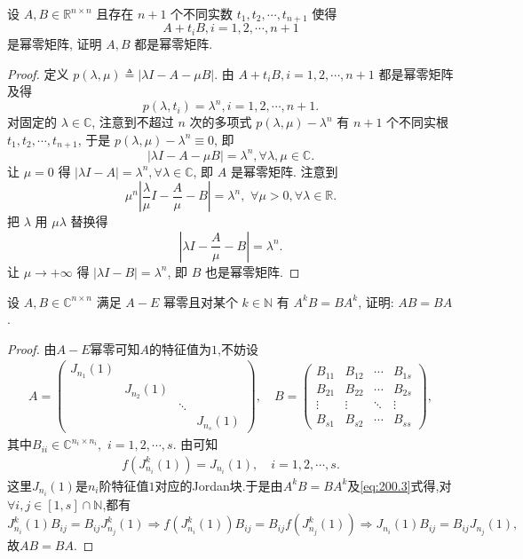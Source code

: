 \documentclass[../../main.tex]{subfiles}
\begin{document}
\begin{example}
设 \( A,B \in \mathbb{R}^{n \times n} \) 且存在 \( n+1 \) 个不同实数 \( t_1,t_2,\cdots,t_{n+1} \) 使得
\[
A + t_i B, i = 1,2,\cdots,n+1
\]
是幂零矩阵, 证明 \( A,B \) 都是幂零矩阵.
\end{example}
\begin{proof}
定义 \( p(\lambda,\mu) \triangleq |\lambda I - A - \mu B| \). 由 \( A + t_i B, i = 1,2,\cdots,n+1 \) 都是幂零矩阵及得
\[
p(\lambda,t_i) = \lambda^n, i = 1,2,\cdots,n+1.
\]
对固定的 \( \lambda \in \mathbb{C} \), 注意到不超过 \( n \) 次的多项式 \( p(\lambda,\mu)-\lambda^n \) 有 \( n+1 \) 个不同实根 \( t_1,t_2,\cdots,t_{n+1} \), 于是 \( p(\lambda,\mu)-\lambda^n \equiv 0 \), 即
\[
|\lambda I - A - \mu B| = \lambda^n, \forall \lambda, \mu \in \mathbb{C}.
\]
让 \( \mu = 0 \) 得 \( |\lambda I - A| = \lambda^n, \forall \lambda \in \mathbb{C} \), 即 \( A \) 是幂零矩阵. 注意到
\[
\mu^n \left| \frac{\lambda}{\mu} I - \frac{A}{\mu} - B \right| = \lambda^n,\,\, \forall \mu >0,\forall \lambda \in \mathbb{R}.
\]
把 \( \lambda \) 用 \( \mu\lambda \) 替换得
\[
\left| \lambda I - \frac{A}{\mu} - B \right| = \lambda^n.
\]
让 \( \mu \to +\infty \) 得 \( |\lambda I - B| = \lambda^n \), 即 \( B \) 也是幂零矩阵.

\end{proof}

\begin{example}
设 \( A,B \in \mathbb{C}^{n \times n} \) 满足 \( A - E \) 幂零且对某个 \( k \in \mathbb{N} \) 有 \( A^k B = BA^k \), 证明: \( AB = BA \).
\end{example}
\begin{proof}
由$A-E$幂零可知$A$的特征值为$1$,不妨设
\begin{align*}
A=\begin{pmatrix}
J_{n_1}(1)&&&\\
&J_{n_2}(1)&&\\
&&\ddots&\\
&&&J_{n_s}(1)
\end{pmatrix},\quad B=\begin{pmatrix}
B_{11}&B_{12}&\cdots&B_{1s}\\
B_{21}&B_{22}&\cdots&B_{2s}\\
\vdots&\vdots&\ddots&\vdots\\
B_{s1}&B_{s2}&\cdots&B_{ss}
\end{pmatrix},
\end{align*}
其中$B_{ii}\in \mathbb{C} ^{n_i\times n_i},\,\,i=1,2,\cdots ,s.$
由可知
\begin{align}
f\left( J_{n_i}^{k}(1) \right) =J_{n_i}(1),\quad i=1,2,\cdots ,s.
\label{eq:200.3}
\end{align}
这里$J_{n_i}(1)$是$n_i$阶特征值$1$对应的Jordan块.于是由$A^kB=BA^k$及\eqref{eq:200.3}式得,对$\forall i,j\in [1,s] \cap \mathbb{N}$,都有
\[
J_{n_i}^{k}(1) B_{ij}=B_{ij}J_{n_j}^{k}(1) \Longrightarrow f\left( J_{n_i}^{k}(1) \right) B_{ij}=B_{ij}f\left( J_{n_j}^{k}(1) \right) \Longrightarrow J_{n_i}(1) B_{ij}=B_{ij}J_{n_j}(1),
\]
故$AB=BA$.

\end{proof}
\end{document}
